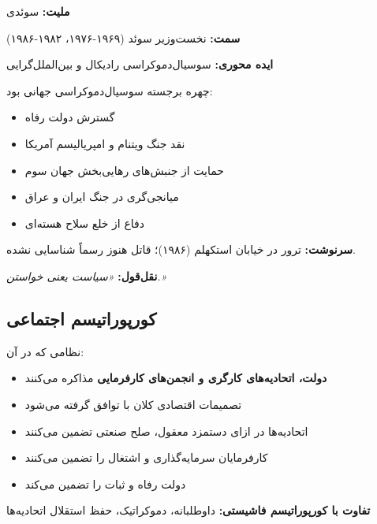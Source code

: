 \begin{personbox}

\textbf{ملیت:} سوئدی

\textbf{سمت:} نخست‌وزیر سوئد (۱۹۶۹-۱۹۷۶، ۱۹۸۲-۱۹۸۶)

\textbf{ایده محوری:} سوسیال‌دموکراسی رادیکال و بین‌الملل‌گرایی

\mediumspace

 چهره برجسته سوسیال‌دموکراسی جهانی بود:

\begin{itemize}[nosep]
    \item گسترش دولت رفاه
    \item نقد جنگ ویتنام و امپریالیسم آمریکا
    \item حمایت از جنبش‌های رهایی‌بخش جهان سوم
    \item میانجی‌گری در جنگ ایران و عراق
    \item دفاع از خلع سلاح هسته‌ای
\end{itemize}

\mediumspace

\textbf{سرنوشت:} ترور در خیابان استکهلم (۱۹۸۶)؛ قاتل هنوز رسماً شناسایی نشده.

\mediumspace

\textbf{نقل‌قول:} \textit{«سیاست یعنی خواستن.»}
\end{personbox}

\subsection{کورپوراتیسم اجتماعی}

\begin{defbox}
نظامی که در آن:
\begin{itemize}[nosep]
    \item \textbf{دولت، اتحادیه‌های کارگری و انجمن‌های کارفرمایی} مذاکره می‌کنند
    \item تصمیمات اقتصادی کلان با توافق گرفته می‌شود
    \item اتحادیه‌ها در ازای دستمزد معقول، صلح صنعتی تضمین می‌کنند
    \item کارفرمایان سرمایه‌گذاری و اشتغال را تضمین می‌کنند
    \item دولت رفاه و ثبات را تضمین می‌کند
\end{itemize}

\textbf{تفاوت با کورپوراتیسم فاشیستی:} داوطلبانه، دموکراتیک، حفظ استقلال اتحادیه‌ها
\end{defbox}

